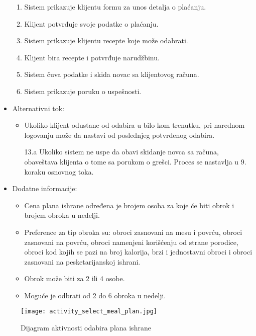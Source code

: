\begin{itemize}
\begin{enumerate}
            \item Sistem prikazuje klijentu formu za unos detalja o plaćanju.
            \item Klijent potvrđuje svoje podatke o plaćanju.
            \item Sistem prikazuje klijentu recepte koje može odabrati.
            \item Klijent bira recepte i potvrđuje narudžbinu.
            \item Sistem čuva podatke i skida novac sa klijentovog računa.
            \item Sistem prikazuje poruku o uspešnosti. 
        \end{enumerate}
    \item Alternativni tok:
        \begin{itemize}
            \item Ukoliko klijent odustane od odabira u bilo kom trenutku, pri narednom logovanju može da nastavi od poslednjeg potvrđenog odabira.
            \item[13.a] Ukoliko sistem ne uspe da obavi skidanje novca sa računa, obaveštava klijenta o tome sa porukom o grešci. Proces se nastavlja u 9. koraku osnovnog toka.
        \end{itemize}
    \item Dodatne informacije:
        \begin{itemize}
            \item Cena plana ishrane određena je brojem osoba za koje će biti obrok i brojem obroka u nedelji.
            \item Preference za tip obroka su: obroci zasnovani na mesu i povrću, obroci zasnovani na povrću, obroci namenjeni korišćenju od strane porodice, obroci kod kojih se pazi na broj kalorija, brzi i jednostavni obroci i obroci zasnovani na pesketarijanskoj ishrani. 
            \item Obrok može biti za 2 ili 4 osobe.
            \item Moguće je odbrati od 2 do 6 obroka u nedelji.
        \end{itemize}
\end{itemize}

\begin{figure}[H]
\begin{center}
\texttt{[image: activity\_select\_meal\_plan.jpg]}
\end{center}
    \caption{Dijagram aktivnosti odabira plana ishrane}
\label{fig:ActivitySelectMealPlan}
\end{figure}
